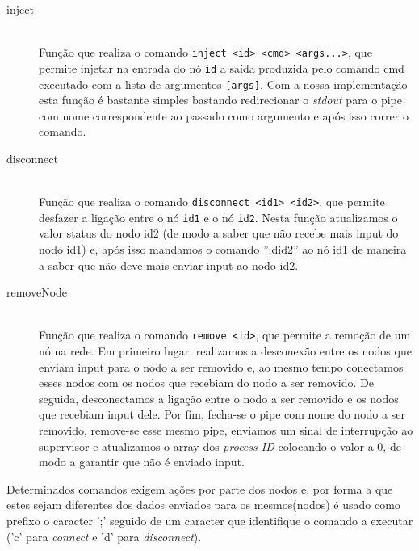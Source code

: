 \documentclass[12pt]{article}
\begin{document}
\begin{description}
\item[inject] \hfill \\
    Função que realiza o comando \texttt{inject <id> <cmd> <args...>}, que permite injetar na entrada do nó \texttt{id} a saída produzida pelo comando cmd executado com a lista de argumentos \texttt{[args]}. Com a nossa implementação esta função é bastante simples bastando redirecionar o \textit{stdout} para o pipe com nome correspondente ao passado como argumento e após isso correr o comando. 

\item[disconnect] \hfill \\
    Função que realiza o comando \texttt{disconnect <id1> <id2>}, que permite desfazer a ligação entre o nó \texttt{id1} e o nó \texttt{id2}. Nesta função atualizamos o valor status do nodo id2 (de modo a saber que não recebe mais input do nodo id1) e, após isso mandamos o comando '';did2'' ao nó id1 de maneira a saber que não deve mais enviar input ao nodo id2. 

\item[removeNode] \hfill \\
    Função que realiza o comando \texttt{remove <id>}, que permite a remoção de um nó na rede. Em primeiro lugar, realizamos a desconexão entre os nodos que enviam input para o nodo a ser removido e, ao mesmo tempo conectamos esses nodos com os nodos que recebiam do nodo a ser removido. De seguida, desconectamos a ligação entre o nodo a ser removido e os nodos que recebiam input dele. Por fim, fecha-se o pipe com nome do nodo a ser removido, remove-se esse mesmo pipe, enviamos um sinal de interrupção ao supervisor e atualizamos o array dos \textit{process ID} colocando o valor a 0, de modo a garantir que não é enviado input.
\end{description}

Determinados comandos exigem ações por parte dos nodos e, por forma a que estes sejam diferentes dos dados enviados para os mesmos(nodos) é usado como prefixo o caracter ';' seguido de um caracter que identifique o comando a executar ('c' para \textit{connect} e 'd' para \textit{disconnect}).
\end{document}
